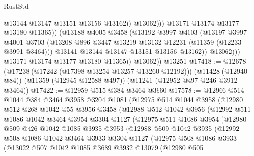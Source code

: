 \begin{lexlean}{RustStd}
\begin{coremodule}
{{{{{{{{{{{{{{{{{{{                              @13144
                              @13147
                              @13151
                              @13156
                              @13162))
                          @13062)))
                    @13171
                    @13174
                    @13177
                    @13180
                    @11365))
                (@13188
                  @4005
                  @3458
                  (@13192
                    @3997
                    @4003
                    (@13197
                      @3997
                      @4001
                      @3703
                      (@13208 @896 @3447 @13219 @13132 @12231 (@11359 (@12233 @3991 @3464)))
                      @13141
                      @13144
                      @13147
                      @13151
                      @13156
                      @13162))
                  @13062)))
            @13171
            @13174
            @13177
            @13180
            @11365))
        @13062))
    @13251
@17418 := @12678
    (@17238 (@17242 (@17398 @13254 @13257 @13260 @12192)))
    (@11428 (@12940 @84))
    (@11359 (@12945 @12588 @497))
    (@11241 (@12952 @497 @246 @3912 @3464))
@17422 := @12959 @515 @384 @3464 @3960
@17578 := @12966
    @514
    @1044
    @384
    @3464
    @3958
    @3204
    @1081
    (@12975
      @514
      @1044
      @3958
      (@12980
        @512
        @268
        @1042
        @55
        @3956
        @3458
        (@12988
          @512
          @1042
          @3956
          (@12992
            @511
            @1086
            @1042
            @3464
            @3954
            @3304
            @1127
            (@12975
              @511
              @1086
              @3954
              (@12980
                @509
                @426
                @1042
                @1085
                @3935
                @3953
                (@12988
                  @509
                  @1042
                  @3935
                  (@12992
                    @508
                    @1086
                    @1042
                    @3464
                    @3933
                    @3304
                    @1127
                    (@12975
                      @508
                      @1086
                      @3933
                      (@13022
                        @507
                        @1042
                        @1085
                        @3689
                        @3932
                        @13079
                        (@12980
                          @505
}}}}}}}}}}}}}}}}}}}
\end{coremodule}
\end{lexlean}
